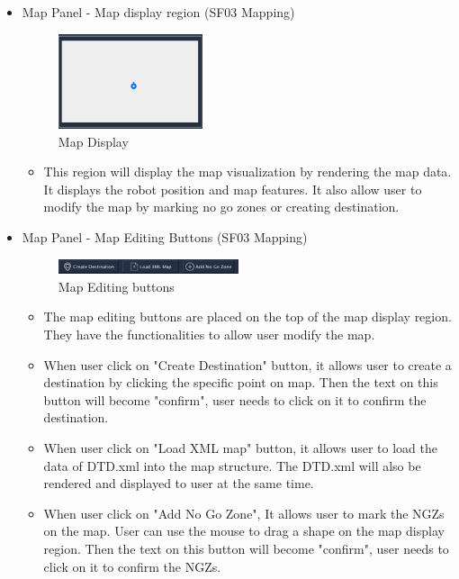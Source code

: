 \documentclass[12pt,a4paper]{article}
\begin{document}
\begin{itemize}
\item Map Panel - Map display region (SF03 Mapping)\\
\begin{figure}[!htb]
\centering
\includegraphics[width=0.4\textwidth]{MapDisplay}
\caption{Map Display} 
\end{figure}
\begin{itemize}
\item This region will display the map visualization by rendering the map data. It displays the robot position and map features. It also allow user to modify the map by marking no go zones or creating destination. 
\end{itemize}

\item Map Panel - Map Editing Buttons (SF03 Mapping)\\
\begin{figure}[!htb]
\centering
\includegraphics[width=0.5\textwidth]{MapEditing}
\caption{Map Editing buttons} 
\end{figure}
\begin{itemize}
\item The map editing buttons are placed on the top of the map display region. They have the functionalities to allow user modify the map.
\item When user click on "Create Destination" button, it allows user to create a destination by clicking the specific point on map. Then the text on this button will become "confirm", user needs to click on it to confirm the destination.
\item When user click on "Load XML map" button, it allows user to load the data of DTD.xml into the map structure. The DTD.xml will also be rendered and displayed to user at the same time.
\item When user click on "Add No Go Zone", It allows user to mark the NGZs on the map. User can use the mouse to drag a shape on the map display region. Then the text on this button will become "confirm", user needs to click on it to confirm the NGZs.
\end{itemize}


\end{itemize}
\end{document}
